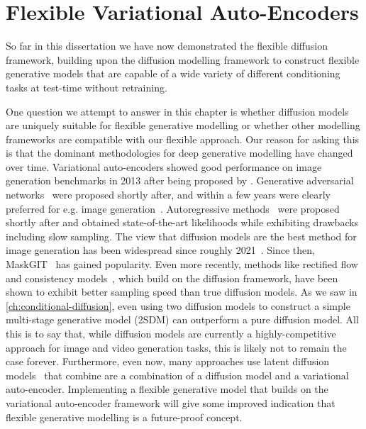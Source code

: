 \chapter{Flexible Variational Auto-Encoders}
\label{ch:cigcvae}


So far in this dissertation we have now demonstrated the flexible diffusion framework, building upon the diffusion modelling framework to construct flexible generative models that are capable of a wide variety of different conditioning tasks at test-time without retraining.

One question we attempt to answer in this chapter is whether diffusion models are uniquely suitable for flexible generative modelling or whether other modelling frameworks are compatible with our flexible approach. Our reason for asking this is that the dominant methodologies for deep generative modelling have changed over time. Variational auto-encoders showed good performance on image generation benchmarks in 2013 after being proposed by \citet{kingma2013auto}. Generative adversarial networks~\citep{goodfellow2014generative} were proposed shortly after, and within a few years were clearly preferred for e.g. image generation~\citep{karras2018style}. Autoregressive methods~\citep{van2016pixel} were proposed shortly after and obtained state-of-the-art likelihoods while exhibiting drawbacks including slow sampling. The view that diffusion models are the best method for image generation has been widespread since roughly 2021~\citep{dhariwal2021diffusion}. Since then, MaskGIT~\citep{chang2022maskgit} has gained popularity. Even more recently, methods like rectified flow~\citep{esser2024scaling} and consistency models~\citep{song2023consistency}, which build on the diffusion framework, have been shown to exhibit better sampling speed than true diffusion models. As we saw in \cref{ch:conditional-diffusion}, even using two diffusion models to construct a simple multi-stage generative model (2SDM) can outperform a pure diffusion model. All this is to say that, while diffusion models are currently a highly-competitive approach for image and video generation tasks, this is likely not to remain the case forever. Furthermore, even now, many approaches use latent diffusion models~\citep{rombach2022high} that combine are a combination of a diffusion model and a variational auto-encoder. Implementing a flexible generative model that builds on the variational auto-encoder framework will give some improved indication that flexible generative modelling is a future-proof concept.

